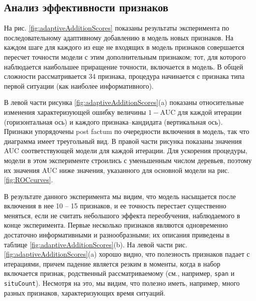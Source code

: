 \begin{figure*}[thpb]
\begin{center}
\begin{subfigure}[c]{\textwidth}
\begin{tabular}{ l p{7cm} l}
  \bottomrule
\end{tabular}
\end{subfigure}
\caption{Анализ важности признаков с помощью их последовательного жадного добавления. На каждой итерации к текущему набору признаков, начиная с {\texttt First\_Situation\_id}, добавляется новый признак, при котором точность ранжирования увеличивается сильнее всего. (a)  На диаграмме слева показаны относительные изменения величины $1-\textrm{AUC}$ при добавлении каждого из признаков, не входящих в текущий набор. График справа показывает динамику точности предсказательной модели, построенной по текущему набору признаков. (b) Несколько первых признаков, до насыщения модели.}\label{fig:adaptiveAdditionScores}
\end{center}
\end{figure*}

\subsection{Анализ эффективности признаков}\label{sec:greedy}
На рис. \ref{fig:adaptiveAdditionScores} показаны результаты эксперимента по последовательному адаптивному добавлению в модель новых признаков. На каждом шаге для каждого из еще не входящих в модель признаков совершается пересчет точности модели с этим дополнительным признаком; тот, для которого наблюдается наибольшее приращение точности, включается в модель. В общей сложности рассматривается 34 признака, процедура начинается с признака типа первой ситуации (как наиболее информативного). 

В левой части рисунка \ref{fig:adaptiveAdditionScores}(a) показаны относительные изменения характеризующей ошибку величины $1-\text{AUC}$ для каждой итерации (горизонтальная ось) и каждого признака--кандидата (вертикальная ось). Признаки упорядочены post factum по очередности включения в модель, так что диаграмма имеет треугольный вид. В правой части рисунка показаны значения AUC соответствующей модели для каждой итерации. Для ускорения процедуры, модели в этом эксперименте строились с уменьшенным числом деревьев, поэтому их значения AUC ниже значения, указанного для основной модели на рис. \ref{fig:ROCcurves}. 

В результате данного эксперимента мы видим, что модель насыщается после включения в нее 10 -- 15 признаков, и ее точность перестает существенно меняться, если не считать небольшого эффекта переобучения, наблюдаемого в конце эксперимента. Первые несколько признаков являются одновременно достаточно информативными и разнообразными; их описания приведены в таблице \ref{fig:adaptiveAdditionScores}(b). На левой части рис. \ref{fig:adaptiveAdditionScores}(a) хорошо видно, что полезность признаков падает с итерациями, причем падение является резким в моменты, когда в набор включается признак, родственный рассматриваемому (см., например, \texttt{span} и \texttt{situCount}). Несмотря на это, мы видим, что полезно иметь, например, много разных признаков, характеризующих время ситуаций.

